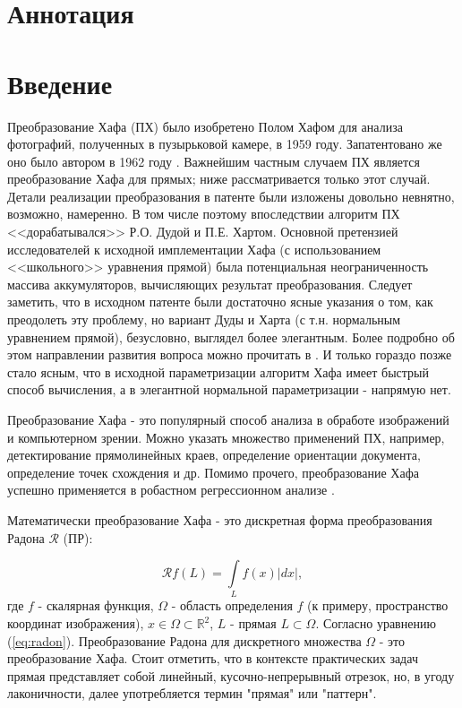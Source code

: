 \section*{Аннотация}
\section{Введение}

Преобразование Хафа (ПХ) было изобретено Полом Хафом для анализа фотографий, полученных в пузырьковой камере, в 1959 году. Запатентовано же оно было автором в 1962 году \cite{Hough1962patent}. Важнейшим частным случаем ПХ является преобразование Хафа для прямых; ниже рассматривается только этот случай. Детали реализации преобразования в патенте были изложены довольно невнятно, возможно, намеренно. В том числе поэтому впоследствии алгоритм ПХ <<дорабатывался>> Р.О. Дудой и П.Е. Хартом. Основной претензией исследователей к исходной имплементации Хафа (с использованием <<школьного>> уравнения прямой) была потенциальная неограниченность массива аккумуляторов, вычисляющих результат преобразования. Следует заметить, что в исходном патенте были достаточно ясные указания о том, как преодолеть эту проблему, но вариант Дуды и Харта (с т.н. нормальным уравнением прямой), безусловно, выглядел более элегантным. Более подробно об этом направлении развития вопроса можно прочитать в \cite{Hart2009}. И только гораздо позже стало ясным, что в исходной параметризации алгоритм Хафа имеет быстрый способ вычисления, а в элегантной нормальной параметризации - напрямую нет.

Преобразование Хафа - это популярный способ анализа в обработе изображений и компьютерном зрении. Можно указать множество применений ПХ, например, детектирование прямолинейных краев, определение ориентации документа, определение точек схождения \cite{NiksKarp2008} и др. Помимо прочего, преобразование Хафа успешно применяется в робастном регрессионном анализе  \cite{Goldenshluger, Ballester1994, bezm2012rus}.

Математически преобразование Хафа - это дискретная форма преобразования Радона $\mathcal{R}$ (ПР):

\begin{equation}\label{eq:radon}
	\mathcal{R}f(L) = \int\limits_{L} f(x) |dx|,
\end{equation}
где $f$ - скалярная функция, $\Omega$ - область определения $f$ (к примеру, пространство координат изображения), $x \in \Omega \subset \mathbb{R}^2$, $L$ - прямая $L \subset \Omega$. Согласно уравнению (\ref{eq:radon}). Преобразование Радона для дискретного множества $\Omega$ - это преобразование Хафа. Стоит отметить, что в контексте практических задач прямая представляет собой линейный, кусочно-непрерывный отрезок, но, в угоду лаконичности, далее употребляется термин "прямая" или "паттерн".

